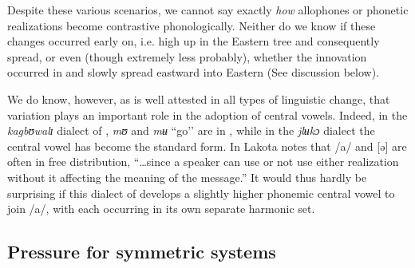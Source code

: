 \documentclass[output=paper
,newtxmath
,modfonts
,nonflat]{langsci/langscibook}
\begin{document}
\begin{table}
\caption{Lakota Dida} 
\label{tab:zogbo:23}
\end{table}

Despite these various scenarios, we cannot say exactly \textit{how} allophones or phonetic realizations become contrastive phonologically.  Neither do we know if these changes occurred early on, i.e. high up in the Eastern  tree and consequently spread, or even (though extremely less probably), whether the innovation occurred in  and slowly spread eastward into Eastern  (See discussion below). 

We do know, however, as is well attested in all types of linguistic change, that variation plays an important role in the adoption of central vowels. Indeed, in the \textit{kagbʊwalɪ} dialect of , \textit{mʊ} and \textit{mʉ} “go’’ are in , while in the \textit{jlʉkɔ} dialect the central vowel has become the standard form. In Lakota  \citet[48]{Guehoun1993} notes that /a/ and [ə] are often in free distribution, “…since a speaker can use or not use either realization without it affecting the meaning of the message.”  It would thus hardly be surprising if this dialect of  develops a slightly higher phonemic central vowel to join /a/, with each occurring in its own separate harmonic set.      

\subsection{Pressure for symmetric systems}\label{sec:zogbo:4.4} 
\end{document}
